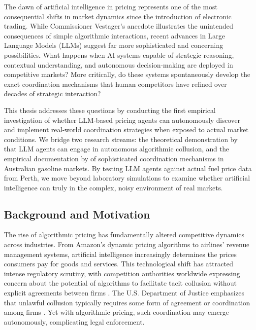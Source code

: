 The dawn of artificial intelligence in pricing represents one of the most consequential shifts in market dynamics since the introduction of electronic trading. While Commissioner Vestager's anecdote illustrates the unintended consequences of simple algorithmic interactions, recent advances in Large Language Models (LLMs) suggest far more sophisticated and concerning possibilities. What happens when AI systems capable of strategic reasoning, contextual understanding, and autonomous decision-making are deployed in competitive markets? More critically, do these systems spontaneously develop the exact coordination mechanisms that human competitors have refined over decades of strategic interaction?

This thesis addresses these questions by conducting the first empirical investigation of whether LLM-based pricing agents can autonomously discover and implement real-world coordination strategies when exposed to actual market conditions. We bridge two research streams: the theoretical demonstration by \textcite{fish_algorithmic_2025} that LLM agents can engage in autonomous algorithmic collusion, and the empirical documentation by \textcite{byrne_learning_2019} of sophisticated coordination mechanisms in Australian gasoline markets. By testing LLM agents against actual fuel price data from Perth, we move beyond laboratory simulations to examine whether artificial intelligence can truly  in the complex, noisy environment of real markets.

\subsection{Background and Motivation}

The rise of algorithmic pricing has fundamentally altered competitive dynamics across industries. From Amazon's dynamic pricing algorithms to airlines' revenue management systems, artificial intelligence increasingly determines the prices consumers pay for goods and services. This technological shift has attracted intense regulatory scrutiny, with competition authorities worldwide expressing concern about the potential of algorithms to facilitate tacit collusion without explicit agreements between firms \parencite{oecd_algorithmic_2023, harrington_developing_2018}. The U.S. Department of Justice emphasizes that unlawful collusion typically requires some form of agreement or coordination among firms \parencite{usdoj_antitrust}. Yet with algorithmic pricing, such coordination may emerge autonomously, complicating legal enforcement.

